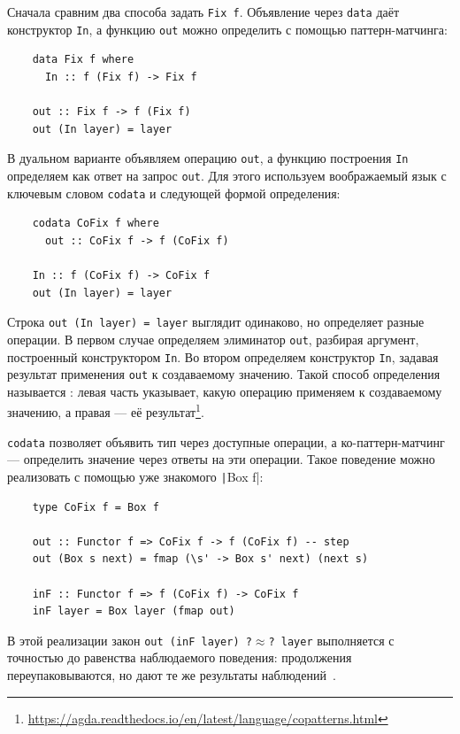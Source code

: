 Сначала сравним два способа задать \texttt{Fix f}.
Объявление через \texttt{data} даёт конструктор \texttt{In}, а функцию \texttt{out} можно определить с помощью паттерн-матчинга:
\begin{verbatim}
    data Fix f where
      In :: f (Fix f) -> Fix f

    out :: Fix f -> f (Fix f)
    out (In layer) = layer
\end{verbatim}

В дуальном варианте объявляем операцию \texttt{out}, а функцию построения \texttt{In} определяем как ответ на запрос \texttt{out}.
Для этого используем воображаемый язык с ключевым словом \texttt{codata} и следующей формой определения:
\begin{verbatim}
    codata CoFix f where
      out :: CoFix f -> f (CoFix f)

    In :: f (CoFix f) -> CoFix f
    out (In layer) = layer
\end{verbatim}
Строка \texttt{out (In layer) = layer} выглядит одинаково, но определяет разные операции.
В первом случае определяем элиминатор \texttt{out}, разбирая аргумент, построенный конструктором \texttt{In}.
Во втором определяем конструктор \texttt{In}, задавая результат применения \texttt{out} к создаваемому значению.
Такой способ определения называется : левая часть указывает, какую операцию применяем к создаваемому значению, а правая --- её результат\footnote{\url{https://agda.readthedocs.io/en/latest/language/copatterns.html}}.

\texttt{codata} позволяет объявить тип через доступные операции, а ко-паттерн-матчинг --- определить значение через ответы на эти операции.
Такое поведение можно реализовать с помощью уже знакомого \texttt|Box f|:
\begin{verbatim}
    type CoFix f = Box f

    out :: Functor f => CoFix f -> f (CoFix f) -- step
    out (Box s next) = fmap (\s' -> Box s' next) (next s)

    inF :: Functor f => f (CoFix f) -> CoFix f
    inF layer = Box layer (fmap out)
\end{verbatim}
В этой реализации закон \texttt{out (inF layer) ?$\approx$? layer} выполняется с точностью до равенства наблюдаемого поведения: продолжения переупаковываются, но дают те же результаты наблюдений~\cite{gibbons2008unfolding}.

